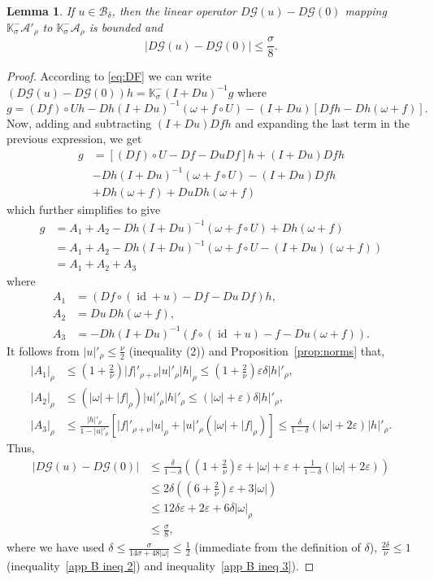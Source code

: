 \documentclass[12pt,reqno,a4paper]{amsart}%
\numberwithin{equation}{section}
\newtheorem{lemma}[theorem]{Lemma}
\newcommand{\Bs}{{\mathscr{B}}}
\newcommand{\A}{{\mathcal A}}
\newcommand{\GG}{{\mathcal G}}
\newcommand{\Kk}{{\mathbb{K}}}
\newcommand{\id}  {\operatorname{id}}
\begin{document}
\begin{lemma}\label{lem:DFu0}
If $u\in\Bs_{\delta}$, then the linear operator $D\GG(u)-D\GG(0)$ mapping $\Kk_\sigma^-\A'_{\rho}$ to $\Kk_\sigma^-\A_{\rho}$ is bounded and
$$
|D\GG(u)-D\GG(0)|\leq \frac{\sigma}{8}.
$$
\end{lemma}
\begin{proof}
According to \eqref{eq:DF} we can write $\left(D\GG(u)-D\GG(0)\right)h=\Kk_\sigma^-(I+Du)^{-1}g$
where 
$$
g=(Df)\circ U h-Dh(I+Du)^{-1}(\omega+f\circ U)-(I+Du)\left[Dfh-Dh(\omega+f)\right].
$$
Now, adding and subtracting $(I+Du)Df h$ and expanding the last term in the previous expression, we get 
\begin{align*}
g&=\left[(Df)\circ U -Df-DuDf\right]h + (I+Du)Df h\\
&-Dh(I+Du)^{-1}(\omega + f\circ U) - (I+Du)Df h\\
&+Dh(\omega+f)+DuDh(\omega+f)
\end{align*}
which further simplifies to give
\begin{align*}
g&=A_1+A_2 -Dh(I+Du)^{-1}(\omega + f\circ U) +Dh(\omega+f)\\
&= A_1+A_2 -Dh(I+Du)^{-1}(\omega+f\circ U - (I+Du)(\omega+f))\\
&=A_1+A_2+A_3
\end{align*}
where 
\begin{align*}
A_1&=\left(Df\circ(\id+u)-Df-Du\,Df\right)h,\\
A_2&=Du\,Dh(\omega+f),\\
A_3&=-Dh(I+Du)^{-1}\left(f\circ(\id+u)-f-Du(\omega+f)\right).
\end{align*}
It follows from $|u|'_\rho\leq\frac\nu2$ (inequality (2)) and Proposition~\ref{prop:norms} that,
\begin{align*}
|A_1|_{\rho}&\leq \left(1+\frac{2}{\nu}\right)|f|'_{\rho+\nu}|u|'_{\rho}|h|_{\rho}\leq \left(1+\frac{2}{\nu}\right) \varepsilon\delta |h|'_{\rho},\\
|A_2|_{\rho}&\leq(|\omega| + |f|_{\rho})|u|'_{\rho}|h|'_{\rho}\leq (|\omega| + \varepsilon)\delta|h|'_{\rho},\\
|A_3|_{\rho}&\leq  \frac{|h|'_{\rho}}{1-|u|'_{\rho}}\left[|f|'_{\rho+\nu}|u|_{\rho}+|u|'_{\rho}(|\omega|+ |f|_{\rho})\right]\leq \frac{\delta}{1-\delta}\left(|\omega|+ 2\varepsilon\right)|h|'_{\rho}.
\end{align*}
Thus,
\begin{align*}
|D\GG(u)-D\GG(0)|
&\leq \frac{\delta}{1-\delta}\left(\left(1+\frac{2}{\nu}\right) \varepsilon + |\omega| + \varepsilon + \frac{1}{1-\delta}\left(|\omega|+ 2\varepsilon\right)\right)\\
&\leq 2\delta\left(\left(6+\frac{2}{\nu}\right) \varepsilon + 3|\omega|\right)\\
&\leq 12\delta\varepsilon + 2\varepsilon + 6\delta|\omega|_\rho\\
&\leq \frac{\sigma}{8},
\end{align*}
where we have used $\delta\leq \frac{\sigma}{14\sigma + 48|\omega|}\leq \frac12$ (immediate from the definition of $\delta$), $\frac{2\delta}{\nu}\leq 1$ (inequality~\eqref{app B ineq 2}) and inequality~\eqref{app B ineq 3}).
\end{proof}
\end{document}
